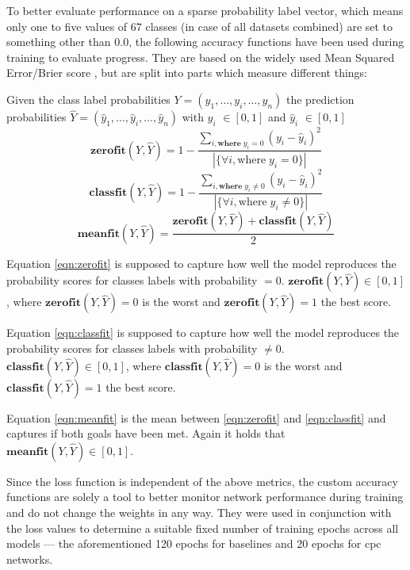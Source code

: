 To better evaluate performance on a sparse probability label vector, which means only one to five values of 67 classes (in case of all datasets combined) are set to something other than 0.0, the following accuracy functions have been used during training to evaluate progress. They are based on the widely used Mean Squared Error/Brier score \autocite{BrierScoreDefinitionExamplesStatisticsHowTo-2022-02-09}, but are split into parts which measure different things:

Given the class label probabilities $Y=(y_1, \ldots, y_i, \ldots, y_n)$ the prediction probabilities $\hat{Y}=(\hat{y}_1,\ldots, \hat{y}_i, \ldots, \hat{y}_n)$ with $y_i$ $\in [0,1]$ and $\hat{y}_i$ $\in [0,1]$
\begin{equation}
	\label{eqn:zerofit}
	\mathbf{zero fit}(Y, \hat{Y}) = 1 - \frac{\sum_{i, \mathbf{where\;} y_i = 0}{(y_i-\hat{y}_i)^2}}{|\{\forall i, \mathrm{where\;} y_i = 0\}|}
\end{equation}
\begin{equation}
	\label{eqn:classfit}
	\mathbf{class fit}(Y, \hat{Y}) = 1 - \frac{\sum_{i, \mathbf{where\;} y_i \neq 0}{(y_i-\hat{y}_i)^2}}{|\{\forall i, \mathrm{where\;} y_i \neq 0\}|}
\end{equation}
\begin{equation}	
	\label{eqn:meanfit}
	\mathbf{mean fit}(Y, \hat{Y}) = \frac{\mathbf{zero fit}(Y, \hat{Y}) + \mathbf{class fit}(Y, \hat{Y})}{2}
\end{equation}

Equation \autoref{eqn:zerofit} is supposed to capture how well the model reproduces the probability scores for classes labels with probability $=0$. $\mathbf{zero fit}(Y, \hat{Y}) \in [0, 1]$, where $\mathbf{zero fit}(Y, \hat{Y}) = 0$ is the worst and $\mathbf{zero fit}(Y, \hat{Y}) = 1$ the best score.

Equation \autoref{eqn:classfit} is supposed to capture how well the model reproduces the probability scores for classes labels with probability $\neq0$. $\mathbf{class fit}(Y, \hat{Y}) \in [0, 1]$, where $\mathbf{class fit}(Y, \hat{Y}) = 0$ is the worst and $\mathbf{class fit}(Y, \hat{Y}) = 1$ the best score.

Equation \autoref{eqn:meanfit} is the mean between \autoref{eqn:zerofit} and \autoref{eqn:classfit} and captures if both goals have been met. Again it holds that $\mathbf{mean fit}(Y, \hat{Y}) \in [0, 1]$.

Since the loss function is independent of the above metrics, the custom accuracy functions are solely a tool to better monitor network performance during training and do not change the weights in any way. They were used in conjunction with the loss values to determine a suitable fixed number of training epochs across all models --- the aforementioned 120 epochs for baselines and 20 epochs for cpc networks.


